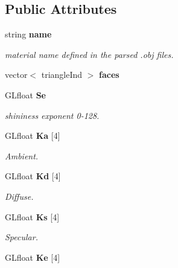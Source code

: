 \subsection*{Public Attributes}
\begin{CompactItemize}
\item 
{}
string {\bf name}\label{classmaterial_m0}

\begin{CompactList}\small\item\em material name defined in the parsed .obj files.\item\end{CompactList}\item 
{}
vector$<$ triangle\-Ind $>$ {\bf faces}\label{classmaterial_m1}

\item 
{}
GLfloat {\bf Se}\label{classmaterial_m2}

\begin{CompactList}\small\item\em shininess exponent 0-128.\item\end{CompactList}\item 
{}
GLfloat {\bf Ka} [4]\label{classmaterial_m3}

\begin{CompactList}\small\item\em Ambient.\item\end{CompactList}\item 
{}
GLfloat {\bf Kd} [4]\label{classmaterial_m4}

\begin{CompactList}\small\item\em Diffuse.\item\end{CompactList}\item 
{}
GLfloat {\bf Ks} [4]\label{classmaterial_m5}

\begin{CompactList}\small\item\em Specular.\item\end{CompactList}\item 
{}
GLfloat {\bf Ke} [4]\label{classmaterial_m6}


\end{CompactItemize}
